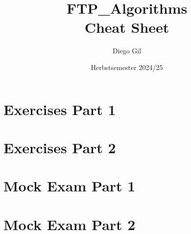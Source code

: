 \documentclass[11pt,a4paper]{article}
\title{\textbf{FTP\_Algorithms}\\
       \large Cheat Sheet}
\author{Diego Gil}
\date{Herbstsemester 2024/25}
\begin{document}
\maketitle

\begin{multicols}{2}
\tableofcontents
\end{multicols}
\newpage

\begin{multicols}{2}


  
\end{multicols}

\begin{multicols}{2}




\end{multicols}

\newpage

\section{Exercises Part 1}
\begin{multicols}{2}





\end{multicols}

\section{Exercises Part 2}
\begin{multicols}{2}

\end{multicols}

\section{Mock Exam Part 1}
\begin{multicols}{2}

\end{multicols}

\section{Mock Exam Part 2}
\begin{multicols}{2}

\end{multicols}
\end{document}
